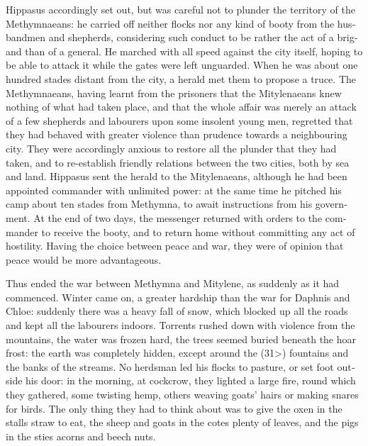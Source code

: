 \documentclass{book}
\begin{document}
\begin{pairs}
\begin{Rightside}
\begin{english}
  Hippasus accordingly set out, but was careful not to plunder the territory of the Methymnaeans: he carried off neither flocks nor any kind of booty from the husbandmen and shepherds, considering such conduct to be rather the act of a brigand than of a general.  He marched with all speed against the city itself, hoping to be able to attack it while the gates were left unguarded.  When he was about one hundred stades distant from the city, a herald met them to propose a truce.  The Methymnaeans, having learnt from the prisoners that the Mitylenaeans knew nothing of what had taken place, and that the whole affair was merely an attack of a few shepherds and labourers upon some insolent young men, regretted that they had behaved with greater violence than prudence towards a neighbouring city.  They were accordingly anxious to restore all the plunder that they had taken, and to re-establish friendly relations between the two cities, both by sea and land.  Hippasus sent the herald to the Mitylenaeans, although he had been appointed commander with unlimited power: at the same time he pitched his camp about ten stades from Methymna, to await instructions from his government.  At the end of two days, the messenger returned with orders to the commander to receive the booty, and to return home without committing any act of hostility.  Having the choice between peace and war, they were of opinion that peace would be more advantageous.
\pend


  Thus ended the war between Methymna and Mitylene, as suddenly as it had commenced.  Winter came on, a greater hardship than the war for Daphnis and Chloe: suddenly there was a heavy fall of snow, which blocked up all the roads and kept all the labourers indoors.  Torrents rushed down with violence from the mountains, the water was frozen hard, the trees seemed buried beneath the hoar frost: the earth was completely hidden, except around the (31>) fountains and the banks of the streams.  No herdsman led his flocks to pasture, or set foot outside his door: in the morning, at cockcrow, they lighted a large fire, round which they gathered, some twisting hemp, others weaving goats' hairs or making snares for birds.  The only thing they had to think about was to give the oxen in the stalls straw to eat, the sheep and goats in the cotes plenty of leaves, and the pigs in the sties acorns and beech nuts.
\pend



\end{english}
\end{Rightside}
\end{pairs}
\end{document}
